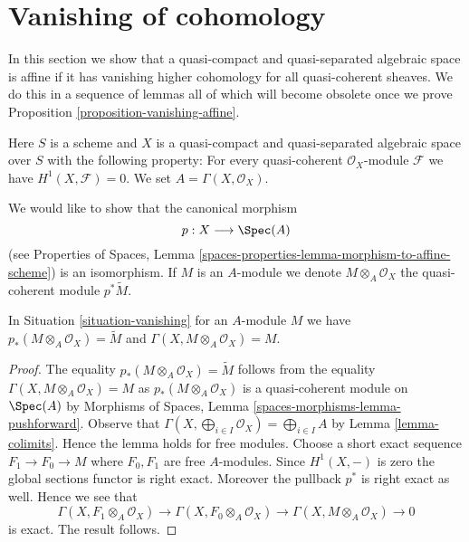 \section{Vanishing of cohomology}
\label{section-vanishing}

\noindent
In this section we show that a quasi-compact and quasi-separated
algebraic space is affine if it has vanishing higher cohomology
for all quasi-coherent sheaves. We do this in a sequence of lemmas
all of which will become obsolete once we prove
Proposition \ref{proposition-vanishing-affine}.

\begin{situation}
\label{situation-vanishing}
Here $S$ is a scheme and $X$ is a quasi-compact and quasi-separated
algebraic space over $S$ with the following property: For every
quasi-coherent $\mathcal{O}_X$-module $\mathcal{F}$ we have
$H^1(X, \mathcal{F}) = 0$. We set $A = \Gamma(X, \mathcal{O}_X)$.
\end{situation}

\noindent
We would like to show that the canonical morphism
$$
p : X \longrightarrow \Spec(A)
$$
(see Properties of Spaces, Lemma
\ref{spaces-properties-lemma-morphism-to-affine-scheme}) is an isomorphism.
If $M$ is an $A$-module we denote $M \otimes_A \mathcal{O}_X$
the quasi-coherent module $p^*\tilde M$.

\begin{lemma}
\label{lemma-vanishing-compute}
In Situation \ref{situation-vanishing} for an $A$-module $M$ we have
$p_*(M \otimes_A \mathcal{O}_X) = \widetilde{M}$ and
$\Gamma(X, M \otimes_A \mathcal{O}_X) = M$.
\end{lemma}

\begin{proof}
The equality $p_*(M \otimes_A \mathcal{O}_X) = \widetilde{M}$ follows
from the equality $\Gamma(X, M \otimes_A \mathcal{O}_X) = M$ as
$p_*(M \otimes_A \mathcal{O}_X)$ is a quasi-coherent module on
$\Spec(A)$ by Morphisms of Spaces, Lemma
\ref{spaces-morphisms-lemma-pushforward}.
Observe that $\Gamma(X, \bigoplus_{i \in I} \mathcal{O}_X) =
\bigoplus_{i \in I} A$ by Lemma \ref{lemma-colimits}. Hence the
lemma holds for free modules. Choose a short exact sequence
$F_1 \to F_0 \to M$ where $F_0, F_1$ are free $A$-modules. Since
$H^1(X, -)$ is zero the global sections functor is right exact.
Moreover the pullback $p^*$ is right exact as well. Hence we see
that
$$
\Gamma(X, F_1 \otimes_A \mathcal{O}_X) \to
\Gamma(X, F_0 \otimes_A \mathcal{O}_X) \to
\Gamma(X, M \otimes_A \mathcal{O}_X) \to 0
$$
is exact. The result follows.
\end{proof}

